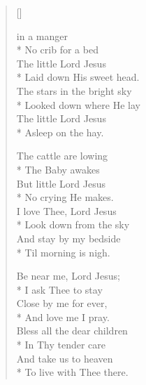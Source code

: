 \newHymn


\begin{verse}[\versewidth]

 in a manger\\*
   No crib for a bed\\
   The little Lord Jesus\\*
   Laid down His sweet head.\\
   The stars in the bright sky\\*
   Looked down where He lay\\
   The little Lord Jesus\\*
   Asleep on the hay.
    
The cattle are lowing\\*
   The Baby awakes\\
   But little Lord Jesus\\*
   No crying He makes.\\
   I love Thee, Lord Jesus\\*
   Look down from the sky\\
   And stay by my bedside\\*
   Til morning is nigh.
    
Be near me, Lord Jesus;\\*
   I ask Thee to stay\\
   Close by me for ever,\\*
   And love me I pray.\\
   Bless all the dear children\\*
   In Thy tender care\\
   And take us to heaven\\*
   To live with Thee there.

\end{verse}




